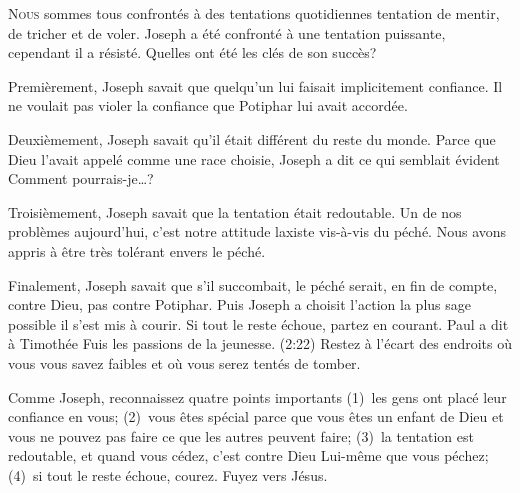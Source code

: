 



\lettrine{N}{ous} sommes tous confrontés à des tentations quotidiennes
 \ocadr{}tentation de mentir, de tricher et de voler.
 Joseph a été confronté à une tentation puissante,
 cependant il a résisté.
 Quelles ont été les clés de son succès? 

Premièrement, Joseph savait que quelqu'un lui faisait implicitement confiance.
 Il ne voulait pas violer la confiance que Potiphar lui avait accordée. 

Deuxièmement, Joseph savait qu'il était différent du reste du monde.
 Parce que Dieu l'avait appelé comme une race choisie,
 Joseph a dit ce qui semblait évident\frcolon{} \Og Comment pourrais-je\dots{}?\Fg{}

Troisièmement, Joseph savait que la tentation était redoutable.
 Un de nos problèmes aujourd'hui, c'est notre attitude laxiste
 vis-à-vis du péché.
 Nous avons appris à être très tolérant envers le péché. 

Finalement, Joseph savait que s'il succombait, le péché serait,
 en fin de compte, contre Dieu, pas contre Potiphar.
 Puis Joseph a choisit l'action la plus sage possible\frcolon{}
 il s'est mis à courir.
 Si tout le reste échoue, partez en courant.
 Paul a dit à Timothée\frcolon{}
 \Og Fuis les passions de la jeunesse. \Fg{}
 (2:22)
 Restez à l'écart des endroits où vous vous savez faibles
 et où vous serez tentés de tomber. 


Comme Joseph, reconnaissez quatre points importants\frcolon{}
 (1)~les gens ont placé leur confiance en vous;
 (2)~vous êtes spécial parce que vous êtes un enfant de Dieu
  et vous ne pouvez pas faire ce que les autres peuvent faire;
 (3)~la tentation est redoutable, et quand vous cédez,
  c'est contre Dieu Lui-même que vous péchez;
 (4)~si tout le reste échoue, courez. Fuyez vers Jésus.

